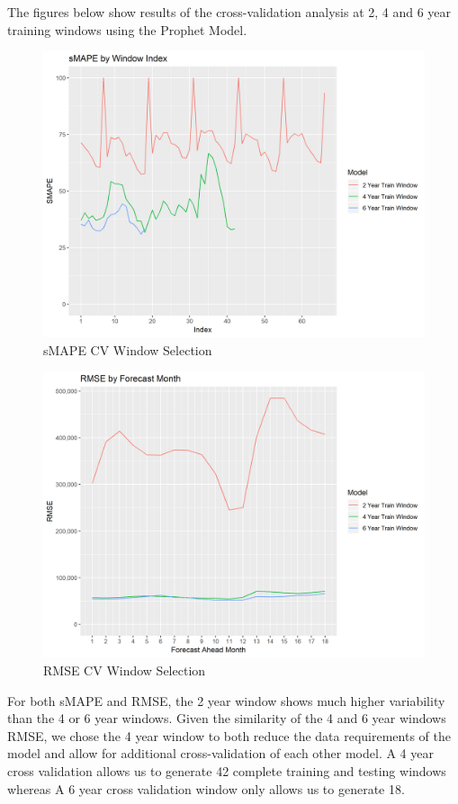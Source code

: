 \documentclass[12pt,oneside]{chicagocapstone}
\begin{document}
The figures below show results of the cross-validation analysis at 2, 4
and 6 year training windows using the Prophet Model.
\begin{figure}
\centering
\includegraphics{./figure/Prophet_SMAPE_CV.png}
\caption{sMAPE CV Window Selection}
\end{figure}
\begin{figure}
\centering
\includegraphics{./figure/Prophet_RMSE_CV.png}
\caption{RMSE CV Window Selection}
\end{figure}
For both sMAPE and RMSE, the 2 year window shows much higher variability
than the 4 or 6 year windows. Given the similarity of the 4 and 6 year
windows RMSE, we chose the 4 year window to both reduce the data
requirements of the model and allow for additional cross-validation of
each other model. A 4 year cross validation allows us to generate 42
complete training and testing windows whereas A 6 year cross validation
window only allows us to generate 18.
\end{document}

